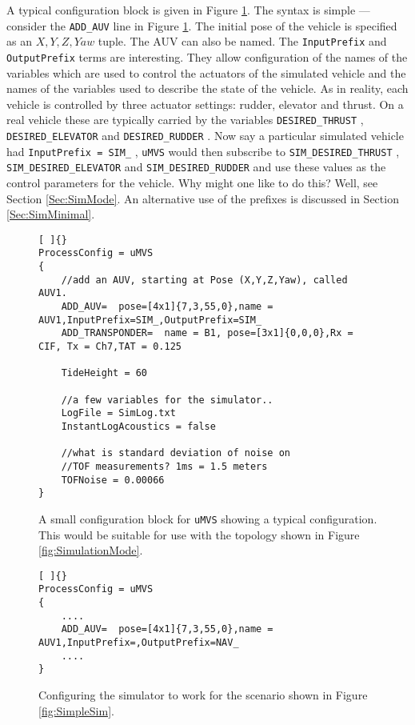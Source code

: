 \documentclass[a4paper,10pt]{article}
\newcommand{\Code}[1]{\texttt{#1} }
\newcommand{\code}[1]{\Code{#1} }
\begin{document}
A typical configuration block is given in Figure \ref{fig:uMVSBlock}. The
syntax is simple --- consider the \code{ADD\_AUV} line in Figure
\ref{fig:uMVSBlock}. The initial pose of the vehicle is specified
as an $X,Y,Z,Yaw$ tuple. The AUV can also be named. The
\code{InputPrefix} and \code{OutputPrefix} terms are interesting.
They allow configuration of the names of the variables which are
used to control the actuators of the simulated vehicle and the
names of the variables used to describe the state of the vehicle.
As in reality, each vehicle is controlled by three actuator
settings: rudder, elevator and thrust. On a real vehicle these are
typically carried by the variables
\code{DESIRED\_THRUST}, \code{DESIRED\_ELEVATOR} and
\code{DESIRED\_RUDDER}. Now say a particular simulated vehicle had
\code{InputPrefix = SIM\_}, \code{uMVS} would then subscribe to
\code{SIM\_DESIRED\_THRUST}, \code{SIM\_DESIRED\_ELEVATOR} and
\code{SIM\_DESIRED\_RUDDER} and use these values as the control
parameters for the vehicle. Why might one like to do this? Well,
see Section \ref{Sec:SimMode}. An alternative use of the prefixes
is discussed in Section \ref{Sec:SimMinimal}.

\begin{figure}[h]
\begin{lstlisting}[ ]{}
ProcessConfig = uMVS
{
    //add an AUV, starting at Pose (X,Y,Z,Yaw), called AUV1.
    ADD_AUV=  pose=[4x1]{7,3,55,0},name = AUV1,InputPrefix=SIM_,OutputPrefix=SIM_
    ADD_TRANSPONDER=  name = B1, pose=[3x1]{0,0,0},Rx = CIF, Tx = Ch7,TAT = 0.125

    TideHeight = 60

    //a few variables for the simulator..
    LogFile = SimLog.txt
    InstantLogAcoustics = false

    //what is standard deviation of noise on
    //TOF measurements? 1ms = 1.5 meters
    TOFNoise = 0.00066
}

\end{lstlisting}
\caption{A small configuration block for \code{uMVS} showing a
typical configuration. This would be suitable for use with the
topology shown in Figure \ref{fig:SimulationMode}.
}\label{fig:uMVSBlock}
\end{figure}


\begin{figure}[h]
\begin{lstlisting}[ ]{}
ProcessConfig = uMVS
{
    ....
    ADD_AUV=  pose=[4x1]{7,3,55,0},name = AUV1,InputPrefix=,OutputPrefix=NAV_
    ....
}

\end{lstlisting}
\caption{Configuring the simulator to work for the scenario shown
in Figure \ref{fig:SimpleSim}. }\label{fig:SimpleuMVSBlock}
\end{figure}
\end{document}
